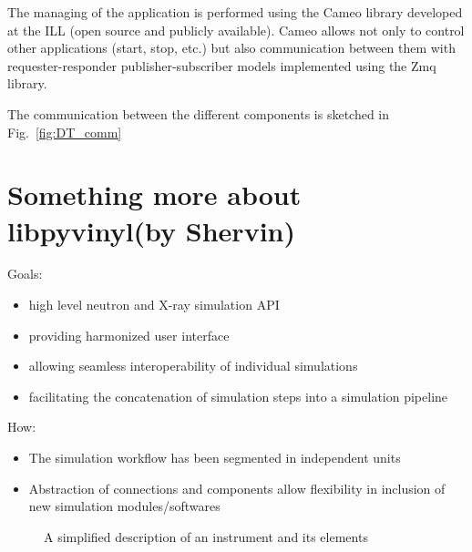 \documentclass[11pt, a4paper]{article}
\begin{document}
The managing of the application is performed using the Cameo library developed at the ILL (open source and publicly available). Cameo allows not only to control other applications (start, stop, etc.) but also communication between them with requester-responder publisher-subscriber models implemented using the Zmq library.

The communication between the different components is sketched in Fig.~\ref{fig:DT_comm}

\newcommand{\libpyvinyl}{libpyvinyl}

\section{Something more about \libpyvinyl (by Shervin)} 

  Goals:
  \begin{itemize}
  \item high level neutron and X-ray simulation API
  \item providing harmonized user interface
  \item allowing seamless interoperability of individual simulations
  \item facilitating the concatenation of simulation steps into a simulation pipeline
  \end{itemize}

  How:
  \begin{itemize}
  \item The simulation workflow has been segmented in independent units
  \item Abstraction of connections and components allow flexibility in inclusion of new simulation modules/softwares
  \end{itemize}

\begin{figure}[tp]
\label{fig:instrument_diagram}
\caption{A simplified description of an instrument and its elements}
\end{figure}
\end{document}
